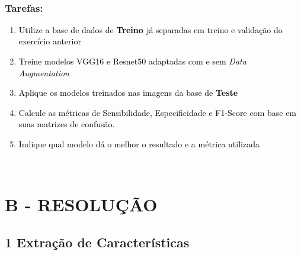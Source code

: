 \textcolor{black}{ }

\subsubsection*{Tarefas:}

\begin{enumerate}[series=listWWNumxxv,label=\alph*),ref=\alph*]
\item \textcolor{black}{Utilize a base de dados de }\textbf{\textcolor{black}{Treino }}\textcolor{black}{ já separadas em
treino e validação do exercício anterior}\textcolor{black}{ }
\item \textcolor{black}{Treine modelos VGG16 e Resnet50 adaptadas com e sem }\textit{\textcolor{black}{Data
Augmentation}}\textcolor{black}{ }
\item \textcolor{black}{Aplique os modelos treinados nas imagens da base de
}\textbf{\textcolor{black}{Teste}}\textcolor{black}{ }
\item \textcolor{black}{Calcule as métricas de Sensibilidade, Especificidade e F1-Score com base em suas matrizes de
confusão.}\textcolor{black}{ }
\item \textcolor{black}{Indique qual modelo dá o melhor o resultado e a métrica utilizada}\textcolor{black}{ }
\end{enumerate}
\textcolor{black}{ }

\section*{\textbf{B - RESOLUÇÃO}}
\subsection*{\textbf{1 Extração de Características }}
